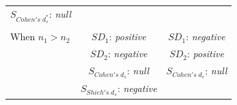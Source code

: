 \documentclass[
  english,
  man]{apa6}
\begin{document}
\begin{longtable}[]{@{}lcc@{}}
\begin{minipage}[t]{0.35\columnwidth}
\(S_{Cohen's \; d^*_s}\): \emph{null}\strut
\end{minipage}\tabularnewline
\begin{minipage}[t]{0.27\columnwidth}\raggedright
\strut
\end{minipage} & \begin{minipage}[t]{0.29\columnwidth}\centering
\strut
\end{minipage} & \begin{minipage}[t]{0.35\columnwidth}\centering
\strut
\end{minipage}\tabularnewline
\begin{minipage}[t]{0.27\columnwidth}\raggedright
When \(n_1>n_2\)\strut
\end{minipage} & \begin{minipage}[t]{0.29\columnwidth}\centering
\(SD_1\): \emph{positive}\strut
\end{minipage} & \begin{minipage}[t]{0.35\columnwidth}\centering
\(SD_1\): \emph{negative}\strut
\end{minipage}\tabularnewline
\begin{minipage}[t]{0.27\columnwidth}\raggedright
\strut
\end{minipage} & \begin{minipage}[t]{0.29\columnwidth}\centering
\(SD_2\): \emph{negative}\strut
\end{minipage} & \begin{minipage}[t]{0.35\columnwidth}\centering
\(SD_2\): \emph{positive}\strut
\end{minipage}\tabularnewline
\begin{minipage}[t]{0.27\columnwidth}\raggedright
\strut
\end{minipage} & \begin{minipage}[t]{0.29\columnwidth}\centering
\(S_{Cohen's \; d_s}\): \emph{null}\strut
\end{minipage} & \begin{minipage}[t]{0.35\columnwidth}\centering
\(S_{Cohen's \; d_s}\): \emph{null}\strut
\end{minipage}\tabularnewline
\begin{minipage}[t]{0.27\columnwidth}\raggedright
\strut
\end{minipage} & \begin{minipage}[t]{0.29\columnwidth}\centering
\(S_{Shieh's \; d_s}\): \emph{negative}\strut
\end{minipage} & \begin{minipage}[t]{0.35\columnwidth}\centering

\end{minipage}
\end{longtable}
\end{document}
